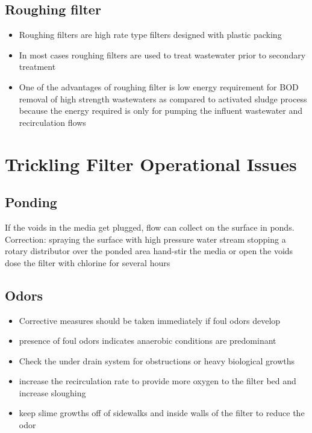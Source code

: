 \subsection{Roughing filter}

\begin{itemize}
\item Roughing filters are high rate type filters designed with plastic packing
\item In most cases roughing filters are used to treat wastewater prior to secondary treatment
\item One of the advantages of roughing filter is low energy requirement for BOD removal of high strength wastewaters as compared to activated sludge process because the energy required is only for pumping the influent wastewater and recirculation flows
\end{itemize}



\section{Trickling Filter Operational Issues}

\subsection{Ponding}


If the voids in the media get plugged, flow can collect on the surface in ponds.
Correction:
spraying the surface with high pressure water stream
stopping a rotary distributor over the ponded area
hand-stir the media or open the voids
dose the filter with chlorine for several hours

\subsection{Odors}


\begin{itemize}
\item Corrective measures should be taken immediately if foul odors develop
\item presence of foul odors indicates anaerobic conditions are predominant
\item Check the under drain system for obstructions or heavy biological growths
\item increase the recirculation rate to provide more oxygen to the filter bed and increase sloughing 
\item keep slime growths off of sidewalks and inside walls of the filter to reduce the odor
\end{itemize}

